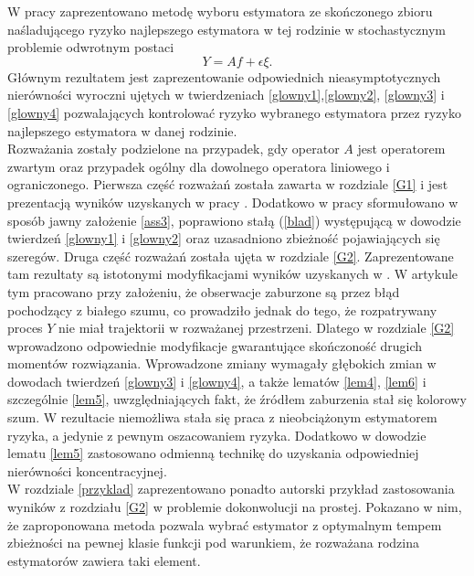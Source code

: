 \documentclass[man,mfiu]{mgrwms}
\begin{document}
\begin{zakonczenie}
W pracy zaprezentowano metodę wyboru estymatora ze skończonego zbioru naśladującego ryzyko najlepszego estymatora w tej rodzinie w stochastycznym problemie odwrotnym postaci 
\begin{displaymath}
Y =  Af+\epsilon\xi.
\end{displaymath}
Głównym rezultatem jest zaprezentowanie odpowiednich nieasymptotycznych nierówności wyroczni ujętych w twierdzeniach \ref{glowny1},\ref{glowny2}, \ref{glowny3} i \ref{glowny4} pozwalających kontrolować ryzyko wybranego estymatora przez ryzyko najlepszego estymatora w danej rodzinie.\\
\indent Rozważania zostały podzielone na przypadek, gdy operator $A$ jest operatorem zwartym oraz przypadek ogólny dla dowolnego operatora liniowego i ograniczonego.  Pierwsza część rozważań została zawarta w rozdziale \ref{G1} i jest prezentacją wyników uzyskanych w pracy \cite{cavalier1}. Dodatkowo w pracy sformułowano w sposób jawny założenie \ref{ass3}, poprawiono stałą (\ref{blad}) występującą w dowodzie twierdzeń \ref{glowny1} i \ref{glowny2} oraz uzasadniono zbieżność pojawiających się szeregów. Druga część rozważań została ujęta w rozdziale \ref{G2}. Zaprezentowane tam rezultaty są istotonymi modyfikacjami wyników uzyskanych w \cite{cavalier2}. W artykule tym pracowano przy założeniu, że obserwacje zaburzone są przez błąd pochodzący z białego szumu, co prowadziło jednak do tego, że rozpatrywany proces $Y$ nie miał trajektorii w rozważanej przestrzeni. Dlatego w rozdziale \ref{G2} wprowadzono odpowiednie modyfikacje gwarantujące skończoność drugich momentów rozwiązania. Wprowadzone zmiany wymagały głębokich zmian w dowodach twierdzeń \ref{glowny3} i \ref{glowny4}, a także lematów \ref{lem4}, \ref{lem6} i szczególnie \ref{lem5}, uwzględniających fakt, że źródłem zaburzenia stał się kolorowy szum. W rezultacie niemożliwa stała się praca z nieobciążonym estymatorem ryzyka, a jedynie z pewnym oszacowaniem ryzyka. Dodatkowo w dowodzie lematu \ref{lem5} zastosowano odmienną technikę do uzyskania odpowiedniej nierówności koncentracyjnej. \\
\indent W rozdziale \ref{przyklad} zaprezentowano ponadto autorski przykład zastosowania wyników z rozdziału \ref{G2} w problemie dokonwolucji na prostej. Pokazano w nim, że zaproponowana metoda pozwala wybrać estymator z optymalnym tempem zbieżności na pewnej klasie funkcji pod warunkiem, że rozważana rodzina estymatorów zawiera taki element.
\end{zakonczenie}
\end{document}
